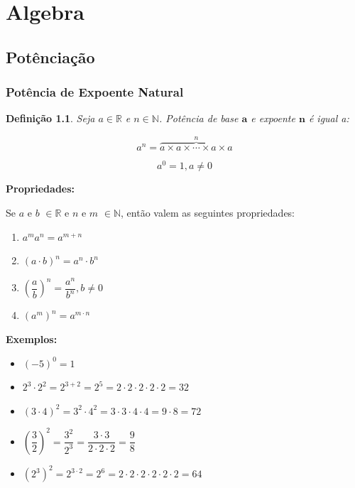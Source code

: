 \chapter{Algebra}


\section{Potênciação}
\subsection{Potência de Expoente Natural}

\newtheorem{definicao}{Definição}
\begin{definicao}
	Seja $a \in \mathbb{R} $ e $ n \in \mathbb{N}$. Potência de base $\textbf{a}$ e expoente $\textbf{n}$ é igual a:
\end{definicao}

\begin{equation*}
a^{n} = \overbrace{a \times a \times \cdots \times a  \times a}^n
\end{equation*}

\begin{equation*}
a^0 = 1 , a \neq 0
\end{equation*}


\textbf{Propriedades:}

Se $a$ e $b$ $ \in \mathbb{R}$ e  $n$ e $ m$ $ \in \mathbb{N}$, então valem as seguintes propriedades:
\begin{enumerate}
	\item $a^{m}a^{n} = a^{m+n}$
	\item $(a\cdot b)^n = a^n \cdot b^n$
	\item $\left(\dfrac{a}{b}\right)^n = \dfrac{a^n}{b^n} , b \neq 0$
	\item $(a^m)^n = a^{m\cdot n}$
\end{enumerate}
\textbf{Exemplos:}

\begin{itemize}

	\item $(-5)^0 = 1$
	\item $2^3 \cdot 2^2 = 2^{3+2} = 2^5 = 2\cdot 2\cdot 2\cdot 2\cdot 2 = 32$
	\item $(3\cdot 4)^2 = 3^2 \cdot 4^2 = 3\cdot 3 \cdot 4 \cdot 4 =9 \cdot 8 = 72$
	\item $\left(\dfrac{3}{2}\right)^2 = \dfrac{3^2}{2^3} = \dfrac{3\cdot 3}{2\cdot 2\cdot 2} =\dfrac{9}{8}$
	\item $(2^3)^2 = 2^{3 \cdot 2} = 2^6= 2\cdot 2\cdot 2\cdot 2\cdot 2 \cdot 2 = 64$
\end{itemize}


